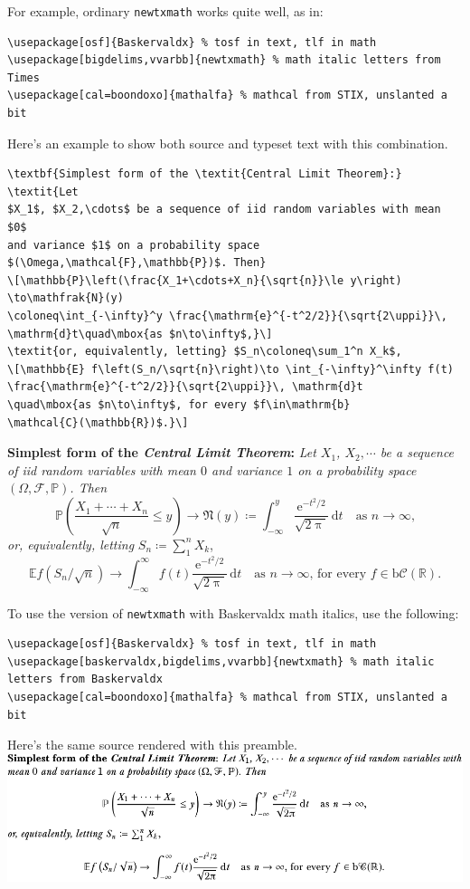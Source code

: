 \documentclass[11pt]{article}
\begin{document}
For example, ordinary {\tt newtxmath} works quite well, as in:
\begin{verbatim}
\usepackage[osf]{Baskervaldx} % tosf in text, tlf in math
\usepackage[bigdelims,vvarbb]{newtxmath} % math italic letters from Times
\usepackage[cal=boondoxo]{mathalfa} % mathcal from STIX, unslanted a bit
\end{verbatim}
Here's an example to show both source and typeset text with this combination.
\begin{verbatim}
\textbf{Simplest form of the \textit{Central Limit Theorem}:} \textit{Let
$X_1$, $X_2,\cdots$ be a sequence of iid random variables with mean $0$ 
and variance $1$ on a probability space $(\Omega,\mathcal{F},\mathbb{P})$. Then}
\[\mathbb{P}\left(\frac{X_1+\cdots+X_n}{\sqrt{n}}\le y\right) \to\mathfrak{N}(y) 
\coloneq\int_{-\infty}^y \frac{\mathrm{e}^{-t^2/2}}{\sqrt{2\uppi}}\,
\mathrm{d}t\quad\mbox{as $n\to\infty$,}\]
\textit{or, equivalently, letting} $S_n\coloneq\sum_1^n X_k$,
\[\mathbb{E} f\left(S_n/\sqrt{n}\right)\to \int_{-\infty}^\infty f(t)
\frac{\mathrm{e}^{-t^2/2}}{\sqrt{2\uppi}}\, \mathrm{d}t
\quad\mbox{as $n\to\infty$, for every $f\in\mathrm{b}
\mathcal{C}(\mathbb{R})$.}\]
\end{verbatim}

\textbf{Simplest form of the \textit{Central Limit Theorem}:} \textit{Let
$X_1$, $X_2,\cdots$ be a sequence of iid random variables with mean $0$ 
and variance $1$ on a probability space $(\Omega,\mathcal{F},\mathbb{P})$. Then}
\[\mathbb{P}\left(\frac{X_1+\cdots+X_n}{\sqrt{n}}\le y\right)\to\mathfrak{N}(y)\coloneq
\int_{-\infty}^y \frac{\mathrm{e}^{-t^2/2}}{\sqrt{2\uppi}}\,
\mathrm{d}t\quad\mbox{as $n\to\infty$,}\]
\textit{or, equivalently, letting} $S_n\coloneq\sum_1^n X_k$,
\[\mathbb{E} f\left(S_n/\sqrt{n}\right)\to \int_{-\infty}^\infty f(t)
\frac{\mathrm{e}^{-t^2/2}}{\sqrt{2\uppi}}\,\mathrm{d}t
\quad\mbox{as $n\to\infty$, for every $f\in\mathrm{b}
\mathcal{C}(\mathbb{R})$.}\]

To use the version of {\tt newtxmath} with Baskervaldx math italics, use the following:\\
\begin{verbatim}
\usepackage[osf]{Baskervaldx} % tosf in text, tlf in math
\usepackage[baskervaldx,bigdelims,vvarbb]{newtxmath} % math italic letters from Baskervaldx
\usepackage[cal=boondoxo]{mathalfa} % mathcal from STIX, unslanted a bit
\end{verbatim}
Here's the same  source rendered  with this preamble.\\[10pt]
\includegraphics{baskervaldxmatheg-crop}

 
\end{document}
